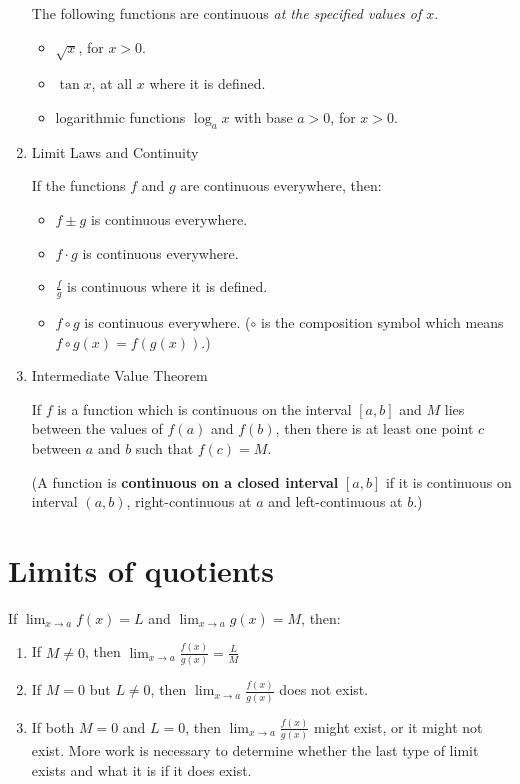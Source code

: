 \begin{enumerate}
        The following functions are continuous \textit{at the specified values of $x$}.
        \begin{itemize}
            \item $\sqrt{x}$, for $x>0$.
            \item $\tan x$, at all $x$ where it is defined.
            \item logarithmic functions $\log_a x$ with base $a>0$, for $x>0$.
        \end{itemize}
    \item Limit Laws and Continuity

        If the functions $f$ and $g$ are continuous everywhere, then:
        \begin{itemize}
            \item $f\pm g$ is continuous everywhere.
            \item $f\cdot g$ is continuous everywhere.
            \item $\frac{f}{g}$ is continuous where it is defined.
            \item $f\circ g$ is continuous everywhere. ($\circ$ is the composition symbol which means $f\circ g(x)=f(g(x))$.)
        \end{itemize}
    \item Intermediate Value Theorem

        If $f$ is a function which is continuous on the interval $[a, b]$ and $M$ lies between the values of $f(a)$ and $f(b)$, then there is at least one point $c$ between $a$ and $b$ such that $f(c)=M$.

        (A function is \textbf{continuous on a closed interval} $[a, b]$ if it is continuous on interval $(a, b)$, right-continuous at $a$ and left-continuous at $b$.)
\end{enumerate}

\section{Limits of quotients}
If $\lim_{x\to a} f(x)=L$ and $\lim_{x\to a} g(x)=M$, then:
\begin{enumerate}
    \item If $M\neq 0$, then $\lim_{x\to a} \frac{f(x)}{g(x)}=\frac{L}{M}$
    \item If $M=0$ but $L\neq 0$, then $\lim_{x\to a} \frac{f(x)}{g(x)}$ does not exist.
    \item If both $M=0$ and $L=0$, then $\lim_{x\to a} \frac{f(x)}{g(x)}$ might exist, or it might not exist. More work is necessary to determine whether the last type of limit exists and what it is if it does exist.
\end{enumerate}

